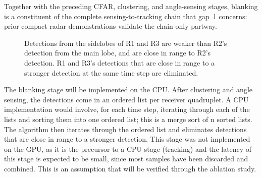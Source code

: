 Together with the preceding CFAR, clustering, and angle-sensing 
stages, blanking is a constituent of the complete sensing-to-tracking chain that gap~1 
concerns: prior compact-radar demonstrations validate the chain only partway. 


\begin{figure}[htbp]
    \centering
    \begin{minipage}{0.5\textwidth}
        \centering
        \caption[Sidelobes of the antenna pattern.]{Receivers R1 and R3, which are pointing away from the target,
        still receive significant power from the first sidelobes lining up with the target. }
        \label{fig:sidelobes}
    \end{minipage}
    \begin{minipage}{0.45\textwidth}
        \centering
        \caption[Blanking for sidelobe suppression.]{Detections from the sidelobes of R1 and R3 are weaker 
        than R2's detection from the main lobe, and are close in range to R2's detection. R1 and R3's
        detections that are close in range to a stronger detection at the same time step are eliminated.}
        \label{fig:blanking}
    \end{minipage}
\end{figure}

The blanking stage will be implemented on the CPU. After clustering and angle sensing, 
the detections come in an ordered list per receiver quadruplet. A CPU implementation would involve,
for each time step, iterating through each of the lists and sorting them into one 
ordered list; this is a merge sort of n sorted lists.  
The algorithm then iterates through the ordered list and eliminates detections that are close 
in range to a stronger detection. This stage was not implemented on the GPU, as it is the precursor to
a CPU stage (tracking) and the latency of this stage is expected to be small, since most samples
have been discarded and combined. This is an assumption that will be verified through the ablation study. 


